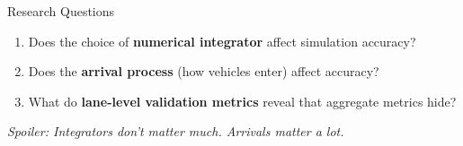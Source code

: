 \documentclass[aspectratio=169]{beamer}
\begin{document}
    \begin{frame}{Research Questions}
        \begin{enumerate}
            \item[\textbf{RQ1:}] Does the choice of \textbf{numerical integrator} affect simulation accuracy?
            \vspace{1em}
            \item[\textbf{RQ2:}] Does the \textbf{arrival process} (how vehicles enter) affect accuracy?
            \vspace{1em}
            \item[\textbf{RQ3:}] What do \textbf{lane-level validation metrics} reveal that aggregate metrics hide?
        \end{enumerate}

        \vspace{1.5em}
        \centering
        \textit{Spoiler: Integrators don't matter much. Arrivals matter a lot.}
    \end{frame}
\end{document}
